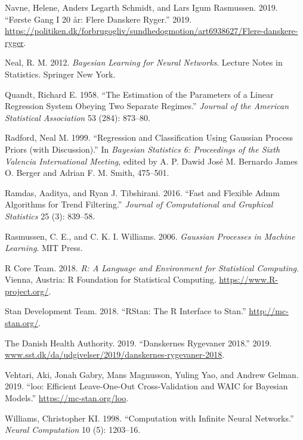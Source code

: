 \documentclass[
  11pt,
]{article}
\theoremstyle{nonumberplain}
\begin{document}
\leavevmode\hypertarget{ref-politiken}{}%
Navne, Helene, Anders Legarth Schmidt, and Lars Igum Rasmussen. 2019.
``Første Gang I 20 år: Flere Danskere Ryger.'' 2019.
\url{https://politiken.dk/forbrugogliv/sundhedogmotion/art6938627/Flere-danskere-ryger}.

\leavevmode\hypertarget{ref-neal2012bayesian}{}%
Neal, R. M. 2012. \emph{Bayesian Learning for Neural Networks}. Lecture
Notes in Statistics. Springer New York.

\leavevmode\hypertarget{ref-quandt1958estimation}{}%
Quandt, Richard E. 1958. ``The Estimation of the Parameters of a Linear
Regression System Obeying Two Separate Regimes.'' \emph{Journal of the
American Statistical Association} 53 (284): 873--80.

\leavevmode\hypertarget{ref-neal1999regression}{}%
Radford, Neal M. 1999. ``Regression and Classification Using Gaussian
Process Priors (with Discussion).'' In \emph{Bayesian Statistics 6:
Proceedings of the Sixth Valencia International Meeting}, edited by A.
P. Dawid José M. Bernardo James O. Berger and Adrian F. M. Smith,
475--501.

\leavevmode\hypertarget{ref-ramdas2016trendfiltering}{}%
Ramdas, Aaditya, and Ryan J. Tibshirani. 2016. ``Fast and Flexible Admm
Algorithms for Trend Filtering.'' \emph{Journal of Computational and
Graphical Statistics} 25 (3): 839--58.

\leavevmode\hypertarget{ref-rasmussen2003gaussian}{}%
Rasmussen, C. E., and C. K. I. Williams. 2006. \emph{Gaussian Processes
in Machine Learning}. MIT Press.

\leavevmode\hypertarget{ref-R-Core-Team:2018aa}{}%
R Core Team. 2018. \emph{R: A Language and Environment for Statistical
Computing}. Vienna, Austria: R Foundation for Statistical Computing.
\url{https://www.R-project.org/}.

\leavevmode\hypertarget{ref-rstan}{}%
Stan Development Team. 2018. ``RStan: The R Interface to Stan.''
\url{http://mc-stan.org/}.

\leavevmode\hypertarget{ref-sst}{}%
The Danish Health Authority. 2019. ``Danskernes Rygevaner 2018.'' 2019.
\url{www.sst.dk/da/udgivelser/2019/danskernes-rygevaner-2018}.

\leavevmode\hypertarget{ref-loo}{}%
Vehtari, Aki, Jonah Gabry, Mans Magnusson, Yuling Yao, and Andrew
Gelman. 2019. ``loo: Efficient Leave-One-Out Cross-Validation and WAIC
for Bayesian Models.'' \url{https://mc-stan.org/loo}.

\leavevmode\hypertarget{ref-williams1998computation}{}%
Williams, Christopher KI. 1998. ``Computation with Infinite Neural
Networks.'' \emph{Neural Computation} 10 (5): 1203--16.
\end{document}
